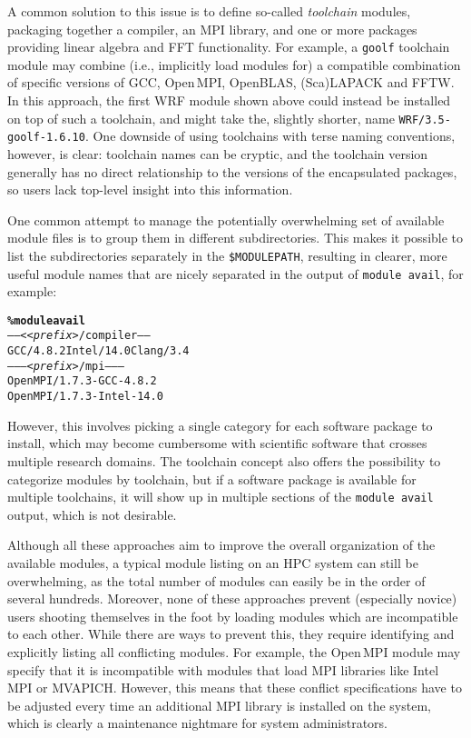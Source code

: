 A common solution to this issue is to define so-called \emph{toolchain}
modules, packaging together a compiler, an MPI library, and one or more packages
providing linear algebra and FFT functionality. For example, a \texttt{\small goolf}
toolchain module may combine (i.e., implicitly load modules for) a compatible combination of specific versions of GCC,
Open\,MPI, OpenBLAS, (Sca)LAPACK and FFTW. In this approach, the
first WRF module shown above could instead be installed on top of such a toolchain,
and might take the, slightly shorter, name \texttt{\small WRF/3.5-goolf-1.6.10}.
One downside of using toolchains with terse naming conventions, however, is clear: toolchain names can be cryptic, and the toolchain version generally has no direct relationship to the versions of the encapsulated packages, so users lack top-level insight into 
this information.

One common attempt to manage the potentially overwhelming set of available
module files is to group them in different subdirectories. This makes 
it possible to list the subdirectories separately in the
\texttt{\small\$MODULEPATH}, resulting in clearer, more useful
 module names that are
nicely separated in the output of
\texttt{\small module avail}, for example:
{\small
\begin{alltt}
    \textbf{\% module avail}
    ----- <\emph{<prefix>}/compiler -----
    GCC/4.8.2   Intel/14.0  Clang/3.4
    -------- \emph{<prefix>}/mpi --------
    OpenMPI/1.7.3-GCC-4.8.2
    OpenMPI/1.7.3-Intel-14.0
\end{alltt}
}
\noindent
However, this involves picking a single category for each software package to
install, which may become cumbersome with scientific software that crosses multiple
research domains. The toolchain concept also offers the possibility to categorize
modules by toolchain, but if a software package is available for multiple
toolchains, it will show up in multiple sections of the \texttt{\small module
avail} output, which is not desirable.


Although all these approaches aim to improve the overall
organization of the available modules, a typical module listing on an HPC
system can still be overwhelming, as the total number of modules can easily
be in the order of several hundreds. Moreover, none of these approaches prevent (especially novice) users shooting themselves in the
foot by loading modules which are incompatible to each other. While
there are ways to prevent this, they require identifying and explicitly listing
all conflicting modules. For example, the Open\,MPI module may
specify that it is incompatible with modules that load MPI libraries like
Intel MPI or MVAPICH. However, this means that these conflict specifications have
to be adjusted every time an additional MPI library is installed on the
system, which is clearly a maintenance nightmare for system administrators.

